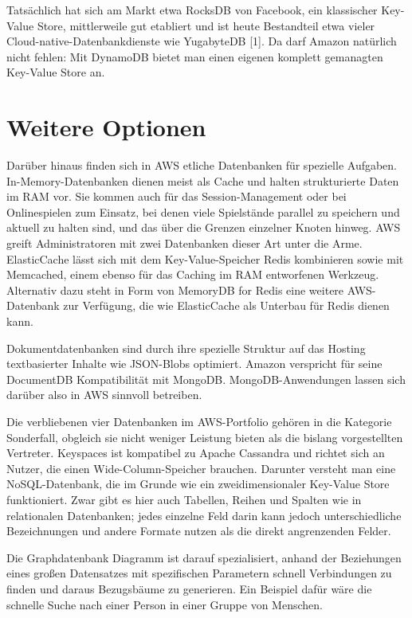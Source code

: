 Tatsächlich hat sich am Markt etwa RocksDB von Facebook, ein klassischer Key-Value Store, mittlerweile gut etabliert und ist heute Bestandteil etwa vieler Cloud-native-Datenbankdienste wie YugabyteDB [1]. Da darf Amazon natürlich nicht fehlen: Mit DynamoDB bietet man einen eigenen komplett gemanagten Key-Value Store an.

\section{Weitere Optionen}

Darüber hinaus finden sich in AWS etliche Datenbanken für spezielle Aufgaben. In-Memory-Datenbanken dienen meist als Cache und halten strukturierte Daten im RAM vor. Sie kommen auch für das Session-Management oder bei Onlinespielen zum Einsatz, bei denen viele Spielstände parallel zu speichern und aktuell zu halten sind, und das über die Grenzen einzelner Knoten hinweg. AWS greift Administratoren mit zwei Datenbanken dieser Art unter die Arme. ElasticCache lässt sich mit dem Key-Value-Speicher Redis kombinieren sowie mit Memcached, einem ebenso für das Caching im RAM entworfenen Werkzeug. Alternativ dazu steht in Form von MemoryDB for Redis eine weitere AWS-Datenbank zur Verfügung, die wie ElasticCache als Unterbau für Redis dienen kann.

Dokumentdatenbanken sind durch ihre spezielle Struktur auf das Hosting textbasierter Inhalte wie JSON-Blobs optimiert. Amazon verspricht für seine DocumentDB Kompatibilität mit MongoDB. MongoDB-Anwendungen lassen sich darüber also in AWS sinnvoll betreiben.

Die verbliebenen vier Datenbanken im AWS-Portfolio gehören in die Kategorie Sonderfall, obgleich sie nicht weniger Leistung bieten als die bislang vorgestellten Vertreter. Keyspaces ist kompatibel zu Apache Cassandra und richtet sich an Nutzer, die einen Wide-Column-Speicher brauchen. Darunter versteht man eine NoSQL-Datenbank, die im Grunde wie ein zweidimensionaler Key-Value Store funktioniert. Zwar gibt es hier auch Tabellen, Reihen und Spalten wie in relationalen Datenbanken; jedes einzelne Feld darin kann jedoch unterschiedliche Bezeichnungen und andere Formate nutzen als die direkt angrenzenden Felder.

Die Graphdatenbank Diagramm ist darauf spezialisiert, anhand der Beziehungen eines großen Datensatzes mit spezifischen Parametern schnell Verbindungen zu finden und daraus Bezugsbäume zu generieren. Ein Beispiel dafür wäre die schnelle Suche nach einer Person in einer Gruppe von Menschen.

